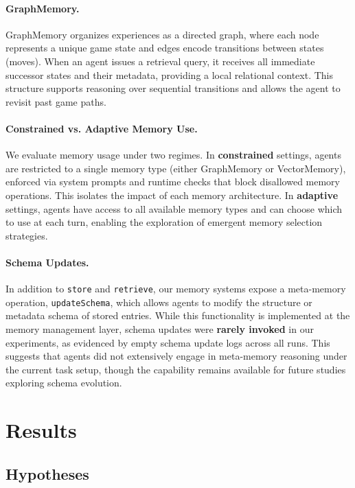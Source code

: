 \documentclass[10pt]{article}
\begin{document}
\paragraph{GraphMemory.}
GraphMemory organizes experiences as a directed graph, where each node represents a unique game state and edges encode transitions between states (moves). When an agent issues a retrieval query, it receives all immediate successor states and their metadata, providing a local relational context. This structure supports reasoning over sequential transitions and allows the agent to revisit past game paths.

\paragraph{Constrained vs. Adaptive Memory Use.}
We evaluate memory usage under two regimes. In \textbf{constrained} settings, agents are restricted to a single memory type (either GraphMemory or VectorMemory), enforced via system prompts and runtime checks that block disallowed memory operations. This isolates the impact of each memory architecture. In \textbf{adaptive} settings, agents have access to all available memory types and can choose which to use at each turn, enabling the exploration of emergent memory selection strategies.

\paragraph{Schema Updates.} 
In addition to \texttt{store} and \texttt{retrieve}, our memory systems expose a meta-memory operation, \texttt{updateSchema}, which allows agents to modify the structure or metadata schema of stored entries. While this functionality is implemented at the memory management layer, schema updates were \textbf{rarely invoked} in our experiments, as evidenced by empty schema update logs across all runs. This suggests that agents did not extensively engage in meta-memory reasoning under the current task setup, though the capability remains available for future studies exploring schema evolution.

\section{Results}

\subsection{Hypotheses}
\end{document}
